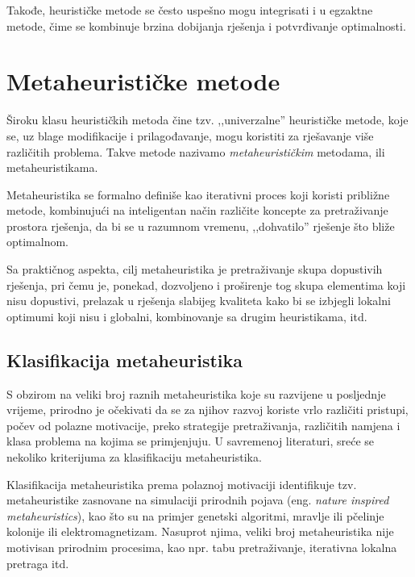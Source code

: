 \documentclass[b5paper, utf8, 11pt, colorlinks]{book}
\theoremstyle{definition}
\begin{document}
 Takođe, heurističke metode se često uspešno mogu integrisati i u egzaktne metode, čime se kombinuje brzina dobijanja rješenja i potvrđivanje optimalnosti.
 
 \section{Metaheurističke metode}
 
 Široku klasu heurističkih metoda čine tzv. ,,univerzalne'' heurističke metode, koje se, uz blage modifikacije i prilagođavanje, mogu koristiti za rješavanje više različitih problema. Takve metode nazivamo \emph{metaheurističkim} metodama, ili metaheuristikama.  
 
 Metaheuristika se formalno definiše kao iterativni proces koji koristi približne metode, kombinujući na inteligentan način različite koncepte za pretraživanje prostora rješenja, da bi se u razumnom vremenu, ,,dohvatilo'' rješenje što bliže optimalnom.
 
 Sa praktičnog aspekta, cilj metaheuristika je pretraživanje skupa dopustivih rješenja, pri čemu je, ponekad, dozvoljeno i proširenje tog skupa elementima koji nisu dopustivi, prelazak u rješenja slabijeg kvali\-teta kako bi se izbjegli lokalni optimumi koji nisu i globalni, kombinovanje sa drugim heuristikama, itd.
 
 \subsection{Klasifikacija metaheuristika}
 S obzirom na veliki broj raznih metaheuristika koje su razvijene u posljednje vrijeme, prirodno je očekivati da se za  njihov razvoj koriste vrlo različiti pristupi, počev od polazne motivacije, preko strategije pretraživanja, različitih namjena i klasa problema na kojima se primjenjuju.
 U savremenoj literaturi, sreće se nekoliko kriterijuma za klasifikaciju metaheuristika.
 
 Klasifikacija metaheuristika prema polaznoj motivaciji identifikuje tzv. metaheuristike zasnovane na simulaciji prirodnih pojava (eng. \emph{nature inspired metaheuristics}), kao što su na primjer genetski algoritmi, mravlje ili pčelinje kolonije ili elektromagnetizam. Nasuprot njima, veliki broj metaheuristika nije motivisan prirodnim procesima, kao npr. tabu pretraživanje, iterativna lokalna pretraga itd.
 
\end{document}
